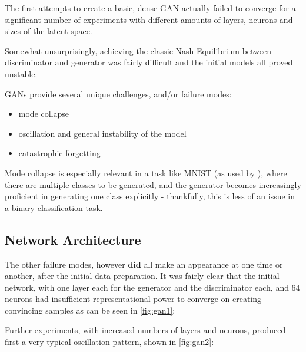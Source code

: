 The first attempts to create a basic, dense \ac{GAN} actually failed to converge for a significant number of experiments with different amounts of layers, neurons and sizes of the latent space. 

Somewhat unsurprisingly, achieving the classic Nash Equilibrium between discriminator and generator was fairly difficult and the initial models all proved unstable. 

\acp{GAN} provide several unique challenges, and/or failure modes:

\begin{itemize}
	\item mode collapse \cite{mode_collapse}
	\item oscillation and general instability of the model \cite{gan_continual_learning}
	\item catastrophic forgetting \cite{catastrophic_forgetting}
\end{itemize}

Mode collapse is especially relevant in a task like MNIST (as used by \cite{goodfellow2014generative}), where there are multiple classes to be generated, and the generator becomes increasingly proficient in generating one class explicitly - thankfully, this is less of an issue in a binary classification task.

\subsection{Network Architecture}
\label{subsection:architecture}

The other failure modes, however \textbf{did} all make an appearance at one time or another, after the initial data preparation. It was fairly clear that the initial network, with one layer each for the generator and the discriminator each, and 64 neurons had insufficient representational power to converge on creating convincing samples as can be seen in \ref{fig:gan1}:


\pagebreak 

Further experiments, with increased numbers of layers and neurons, produced first a very typical oscillation pattern, shown in \ref{fig:gan2}:
 

